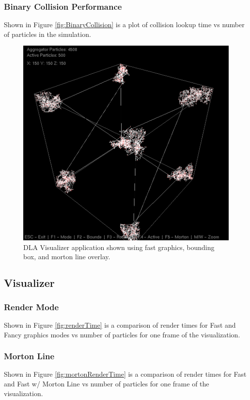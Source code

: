 \documentclass[fleqn,10pt]{UserGuideArx} %
\begin{document}
\subsubsection{Binary Collision Performance}
Shown in Figure \ref{fig:BinaryCollision} is a plot of collision lookup time vs number of particles in the simulation.
\begin{figure}[!ht]\centering %
    \includegraphics[width=\linewidth]{images/CornersMorton.png}
    \caption{DLA Visualizer application shown using fast graphics, bounding box, and morton line overlay.}
    \label{fig:CornersMorton}
\end{figure}

\subsection{Visualizer}
\subsubsection{Render Mode}
Shown in Figure \ref{fig:renderTime} is a comparison of render times for Fast and Fancy graphics modes vs number of particles for one frame of the visualization. 
\subsubsection{Morton Line}
Shown in Figure \ref{fig:mortonRenderTime} is a comparison of render times for Fast and Fast w/ Morton Line vs number of particles for one frame of the visualization.
\end{document}
